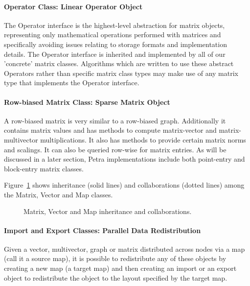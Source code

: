 \documentclass[12pt,relax]{PetraObjectModel}
\begin{document}
\paragraph{Operator Class: Linear Operator Object}

The Operator interface is the highest-level abstraction for matrix objects,
representing only mathematical operations performed with matrices and
specifically avoiding issues relating to storage formats and implementation
details. The Operator interface is inherited and implemented by all of our
'concrete' matrix classes.  Algorithms which are written to use these
abstract Operators rather than specific matrix class types may make use of
any matrix type that implements the Operator interface.

\paragraph{Row-biased Matrix Class: Sparse Matrix Object}

A row-biased matrix is very similar to a row-biased graph.  Additionally it 
contains matrix values and has methods to compute matrix-vector and
matrix-multivector multiplications.  It also has methods to provide certain
matrix norms and scalings.  It can also be queried row-wise for matrix entries.
As will be discussed in a later section, Petra implementations include both
point-entry and block-entry matrix classes.

Figure~\ref{matvecmap} shows inheritance (solid lines) and collaborations
(dotted lines) among the Matrix, Vector and Map classes.
\begin{figure}[ht]
\begin{center}
\caption{Matrix, Vector and Map inheritance and collaborations.}
\label{matvecmap}
\end{center}
\end{figure}

\paragraph{Import and Export Classes:  Parallel Data Redistribution}

Given a vector, multivector, graph or matrix distributed across nodes via a map (call 
it a source map), it is possible to redistribute any of these objects by creating a 
new map (a target map) and then creating an import or an export object to redistribute 
the object to the layout specified by the target map.
\end{document}
